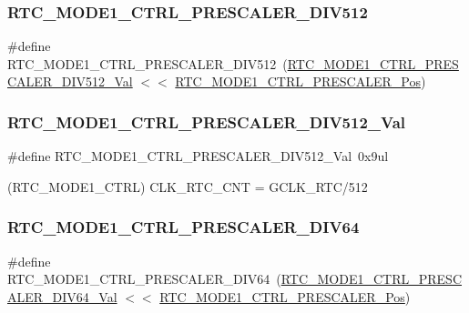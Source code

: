 \subsubsection{\texorpdfstring{RTC\_MODE1\_CTRL\_PRESCALER\_DIV512}{RTC\_MODE1\_CTRL\_PRESCALER\_DIV512}}
{\footnotesize\ttfamily \#define R\+T\+C\+\_\+\+M\+O\+D\+E1\+\_\+\+C\+T\+R\+L\+\_\+\+P\+R\+E\+S\+C\+A\+L\+E\+R\+\_\+\+D\+I\+V512~(\mbox{\hyperlink{group___s_a_m_d21___r_t_c_gac131e13ad11c76c6edf0b3401dff024e}{R\+T\+C\+\_\+\+M\+O\+D\+E1\+\_\+\+C\+T\+R\+L\+\_\+\+P\+R\+E\+S\+C\+A\+L\+E\+R\+\_\+\+D\+I\+V512\+\_\+\+Val}} $<$$<$ \mbox{\hyperlink{group___s_a_m_d21___r_t_c_gad44b853d16e29aa5a84f3bb4087a6e1e}{R\+T\+C\+\_\+\+M\+O\+D\+E1\+\_\+\+C\+T\+R\+L\+\_\+\+P\+R\+E\+S\+C\+A\+L\+E\+R\+\_\+\+Pos}})}

\mbox{\label{group___s_a_m_d21___r_t_c_gac131e13ad11c76c6edf0b3401dff024e}} 
\subsubsection{\texorpdfstring{RTC\_MODE1\_CTRL\_PRESCALER\_DIV512\_Val}{RTC\_MODE1\_CTRL\_PRESCALER\_DIV512\_Val}}
{\footnotesize\ttfamily \#define R\+T\+C\+\_\+\+M\+O\+D\+E1\+\_\+\+C\+T\+R\+L\+\_\+\+P\+R\+E\+S\+C\+A\+L\+E\+R\+\_\+\+D\+I\+V512\+\_\+\+Val~0x9ul}



(R\+T\+C\+\_\+\+M\+O\+D\+E1\+\_\+\+C\+T\+RL) C\+L\+K\+\_\+\+R\+T\+C\+\_\+\+C\+NT = G\+C\+L\+K\+\_\+\+R\+T\+C/512 

\mbox{\label{group___s_a_m_d21___r_t_c_ga967067f59e42a83a06fa09a41ee6df2e}} 
\subsubsection{\texorpdfstring{RTC\_MODE1\_CTRL\_PRESCALER\_DIV64}{RTC\_MODE1\_CTRL\_PRESCALER\_DIV64}}
{\footnotesize\ttfamily \#define R\+T\+C\+\_\+\+M\+O\+D\+E1\+\_\+\+C\+T\+R\+L\+\_\+\+P\+R\+E\+S\+C\+A\+L\+E\+R\+\_\+\+D\+I\+V64~(\mbox{\hyperlink{group___s_a_m_d21___r_t_c_ga18388e853dfca859e4f0b0e97c8b66d4}{R\+T\+C\+\_\+\+M\+O\+D\+E1\+\_\+\+C\+T\+R\+L\+\_\+\+P\+R\+E\+S\+C\+A\+L\+E\+R\+\_\+\+D\+I\+V64\+\_\+\+Val}} $<$$<$ \mbox{\hyperlink{group___s_a_m_d21___r_t_c_gad44b853d16e29aa5a84f3bb4087a6e1e}{R\+T\+C\+\_\+\+M\+O\+D\+E1\+\_\+\+C\+T\+R\+L\+\_\+\+P\+R\+E\+S\+C\+A\+L\+E\+R\+\_\+\+Pos}})}

